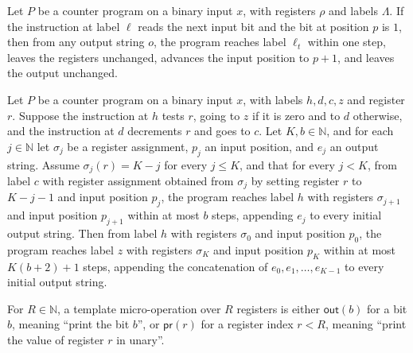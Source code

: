\begin{theorem}
\label{Complexity.CounterProg.goes_rd_true}
\leanok
{}
Let $P$ be a counter program on a binary input $x$, with registers $\rho$ and labels
$\Lambda$. If the instruction at label $\ell$ reads the next input bit and the bit at
position $p$ is $1$, then from any output string $o$, the program reaches label $\ell_t$
within one step, leaves the registers unchanged, advances the input position to $p+1$,
and leaves the output unchanged.
\end{theorem}

\begin{theorem}
\label{Complexity.CounterProg.goes_loop}
\leanok
{}
Let $P$ be a counter program on a binary input $x$, with labels $h,d,c,z$ and register
$r$. Suppose the instruction at $h$ tests $r$, going to $z$ if it is zero and to $d$
otherwise, and the instruction at $d$ decrements $r$ and goes to $c$. Let
$K,b\in\mathbb{N}$, and for each $j\in\mathbb{N}$ let $\sigma_j$ be a register
assignment, $p_j$ an input position, and $e_j$ an output string. Assume
$\sigma_j(r)=K-j$ for every $j\le K$, and that for every $j<K$, from label $c$ with
register assignment obtained from $\sigma_j$ by setting register $r$ to $K-j-1$ and
input position $p_j$, the program reaches label $h$ with registers $\sigma_{j+1}$ and
input position $p_{j+1}$ within at most $b$ steps, appending $e_j$ to every initial
output string. Then from label $h$ with registers $\sigma_0$ and input position $p_0$,
the program reaches label $z$ with registers $\sigma_K$ and input position $p_K$ within
at most $K(b+2)+1$ steps, appending the concatenation of $e_0,e_1,\ldots,e_{K-1}$ to
every initial output string.
\end{theorem}

\begin{definition}
\label{Complexity.CounterProg.MOp}
\leanok
For $R \in \mathbb{N}$, a template micro-operation over $R$ registers is either
$\mathsf{out}(b)$ for a bit $b$, meaning ``print the bit $b$'', or
$\mathsf{pr}(r)$ for a register index $r < R$, meaning ``print the value of
register $r$ in unary''.
\end{definition}

